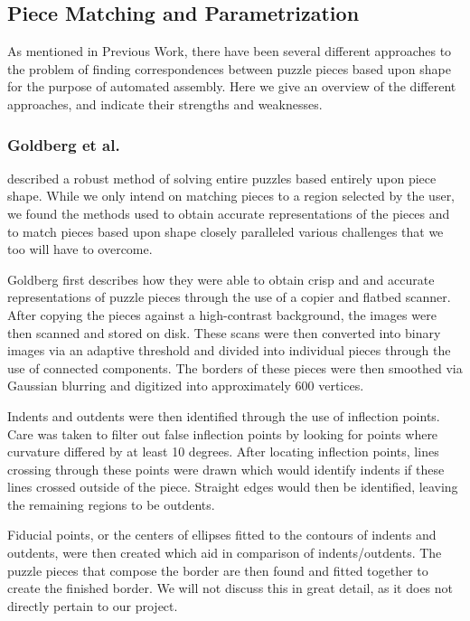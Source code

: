 \documentclass[12pt]{report}
\begin{document}
\subsection*{Piece Matching and Parametrization}
As mentioned in Previous Work, there have been several different approaches to the problem of finding correspondences between puzzle pieces based upon shape for the purpose of automated assembly. Here we give an overview of the different approaches, and indicate their strengths and weaknesses.

\subsubsection*{Goldberg et al.}
\citeauthor{goldberg} \cite{goldberg} described a robust method of solving entire puzzles based entirely upon piece shape. While we only intend on matching pieces to a region selected by the user, we found the methods used to obtain accurate representations of the pieces and to match pieces based upon shape closely paralleled various challenges that we too will have to overcome. 
 
Goldberg first describes how they were able to obtain crisp and and accurate representations of puzzle pieces through the use of a copier and flatbed scanner. After copying the pieces against a high-contrast background, the images were then scanned and stored on disk. These scans were then converted into binary images via an adaptive threshold and divided into individual pieces through the use of connected components. The borders of these pieces were then smoothed via Gaussian blurring and digitized into approximately 600 vertices. 


Indents and outdents were then identified through the use of inflection points. Care was taken to filter out false inflection points by looking for points where curvature differed by at least 10 degrees. After locating inflection points, lines crossing through these points were drawn which would identify indents if these lines crossed outside of the piece. Straight edges would then be identified, leaving the remaining regions to be outdents. 

Fiducial points, or the centers of ellipses fitted to the contours of indents and outdents, were then created which aid in comparison of indents/outdents. The puzzle pieces that compose the border are then found and fitted together to create the finished border. We will not discuss this in great detail, as it does not directly pertain to our project.
\end{document}
